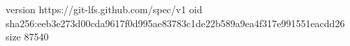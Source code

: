 version https://git-lfs.github.com/spec/v1
oid sha256:eeb3e273d00cda9617f0d995ae83783c1de22b589a9ea4f317e991551eacdd26
size 87540
